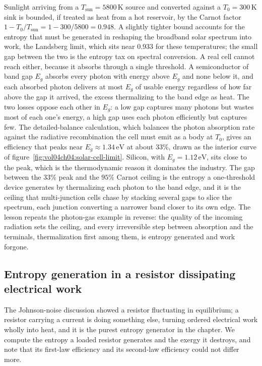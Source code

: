 Sunlight arriving from a $T_{\text{sun}} = 5800\,\si{\kelvin}$ source and converted
against a $T_0 = 300\,\si{\kelvin}$ sink is bounded, if treated as heat from a hot
reservoir, by the Carnot factor $1 - T_0/T_{\text{sun}} = 1 - 300/5800 = 0.948$.
A slightly tighter bound accounts for the entropy that must be generated in
reshaping the broadband solar spectrum into work, the Landsberg limit, which sits
near $0.933$ for these temperatures; the small gap between the two is the entropy
tax on spectral conversion. A real cell cannot reach either, because it absorbs
through a single threshold. A semiconductor of band gap $E_g$ absorbs every photon
with energy above $E_g$ and none below it, and each absorbed photon delivers at most
$E_g$ of usable energy regardless of how far above the gap it arrived, the excess
thermalizing to the band edge as heat. The two losses oppose each other in $E_g$: a
low gap captures many photons but wastes most of each one's energy, a high gap uses
each photon efficiently but captures few. The detailed-balance calculation, which
balances the photon absorption rate against the radiative recombination the cell
must emit as a body at $T_0$, gives an efficiency that peaks near $E_g \approx
1.34\,\si{\electronvolt}$ at about $33\%$, drawn as the interior curve of
figure~\ref{fig:vol04ch04:solar-cell-limit}. Silicon, with $E_g = 1.12\,
\si{\electronvolt}$, sits close to the peak, which is the thermodynamic reason it
dominates the industry. The gap between the $33\%$ peak and the $95\%$ Carnot
ceiling is the entropy a one-threshold device generates by thermalizing each photon
to the band edge, and it is the ceiling that multi-junction cells chase by stacking
several gaps to slice the spectrum, each junction converting a narrower band closer
to its own edge. The lesson repeats the photon-gas example in reverse: the quality
of the incoming radiation sets the ceiling, and every irreversible step between
absorption and the terminals, thermalization first among them, is entropy generated
and work forgone.

\subsection{Entropy generation in a resistor dissipating electrical work}

The Johnson-noise discussion showed a resistor fluctuating in equilibrium; a
resistor carrying a current is doing something else, turning ordered electrical work
wholly into heat, and it is the purest entropy generator in the chapter. We compute
the entropy a loaded resistor generates and the exergy it destroys, and note that
its first-law efficiency and its second-law efficiency could not differ more.

